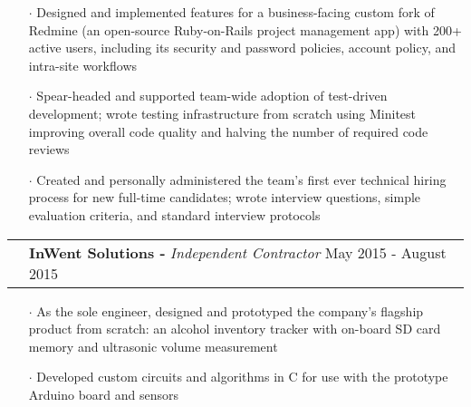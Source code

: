 \documentclass[a4paper, oneside, final]{scrartcl} %
\newcommand{\gray}{\rowcolor[gray]{.90}} %
\begin{document}
\begin{center}
\begin{itemize}
    \item[$\cdot$] Designed and implemented features for a business-facing custom fork of Redmine (an open-source Ruby-on-Rails project management app) with 200+ active users, including its security and password policies, account policy, and intra-site workflows\\
    \item[$\cdot$] Spear-headed and supported team-wide adoption of test-driven development; wrote testing infrastructure from scratch using Minitest improving overall code quality and halving the number of required code reviews \\
    \item[$\cdot$] Created and personally administered the team’s first ever technical hiring process for new full-time candidates; wrote interview questions, simple evaluation criteria, and standard interview protocols\\

  \end{itemize}

  \vspace{-0.2cm}

  \begin{tabularx}{1.00\linewidth}{>{\raggedleft\scshape}p{0cm}X}
    \gray& \textbf{InWent Solutions -} \textit{Independent Contractor} \hfill {May 2015 - August 2015}\\
  \end{tabularx}
  \vspace{-0.5cm}
  \begin{itemize}\itemsep-0.2cm
      \vspace{-0.1cm}

    \item[$\cdot$] As the sole engineer, designed and prototyped the company’s flagship product from scratch: an alcohol inventory tracker with on-board SD card memory and ultrasonic volume measurement  \\
    \item[$\cdot$] Developed custom circuits and algorithms in C for use with the prototype Arduino board and sensors\\


\end{itemize}
\end{center}
\end{document}
